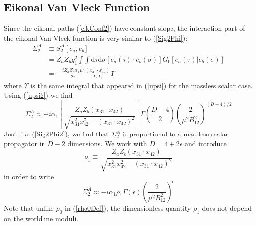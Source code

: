 \subsection{Eikonal Van Vleck Function}
Since the eikonal paths (\ref{eikConf2}) have constant slope, the interaction part of the eikonal Van Vleck function is very similar to (\ref{Sig2Phi}):
\begin{equation}
\begin{split}
	\Sigma_{2}^{A} &\equiv S_{2}^{A}\left[e_{a}, e_{b} \right] \\
	&= Z_{a} Z_{b} g_{1}^{2} \int \int \mathrm{d}\tau \mathrm{d}\sigma \left[ \dot{e}_{a}(\tau) \cdot \dot{e}_{b}(\sigma) \right] G_{0}\left[ e_{a}(\tau) | e_{b}(\sigma) \right] \\
	&= - \frac{i Z_{a} Z_{b} \alpha_{1} \mu^{2}}{2 \pi} \frac{(x_{31} \cdot x_{42})}{T_{a} T_{b}} \Upsilon
\end{split} \label{Sigma2A}
\end{equation}
where $\Upsilon$ is the same integral that appeared in (\ref{upsi}) for the massless scalar case. Using (\ref{upsi2}) we find
\begin{equation}
	\Sigma_{2}^{A} \approx - i \alpha_{1} \left[ \frac{Z_{a} Z_{b} (x_{31} \cdot x_{42})}{\sqrt{x_{31}^{2} x_{42}^{2} - (x_{31} \cdot x_{42})^{2}}} \right] \Gamma\left( \frac{D - 4}{2} \right) \left( \frac{2}{\mu^{2} B_{12}^{2}} \right)^{(D - 4)/2}
\end{equation}
Just like (\ref{Sig2Phi2}), we find that $\Sigma_{2}^{A}$ is proportional to a massless scalar propagator in $D - 2$ dimensions. We work with $D = 4 + 2 \epsilon$ and introduce
\begin{equation}
	\rho_{1} \equiv \frac{Z_{a} Z_{b} (x_{31} \cdot x_{42})}{\sqrt{x_{31}^{2} x_{42}^{2} - (x_{31} \cdot x_{42})^{2}}} \label{rho1Def}
\end{equation}
in order to write
\begin{equation}
	\Sigma_{2}^{A} \approx - i \alpha_{1} \rho_{1} \Gamma(\epsilon) \left( \frac{2}{\mu^{2} B_{12}^{2}} \right)^{\epsilon} \label{Sig2A2}
\end{equation}
Note that unlike $\rho_{0}$ in (\ref{rho0Def}), the dimensionless quantity $\rho_{1}$ does not depend on the worldline moduli.

